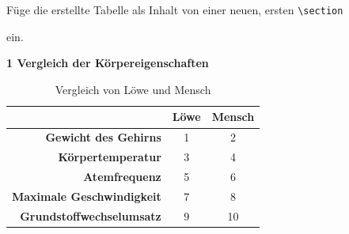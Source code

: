 \documentclass["WS\space 16-17\space -\space LaTeX-Kurs\space -\space Praesentation\space -\space 2.tex"]{subfiles}
\begin{document}
\begin{frame}[fragile]
	\Aufgabee
		Füge die erstellte Tabelle als Inhalt von einer neuen, ersten \lstinline[basicstyle=\normalfont\ttfamily\normalsize]|\section|
        
        \textrm{}
        
        ein.
	\begin{outputbox}
		{\LARGE \textbf{1 Vergleich der Körpereigenschaften}}
		\vspace{-0.3cm}
		\begin{center}
            \begin{table}[htbp] 
                \centering
            	\caption{Vergleich von Löwe und Mensch}
                \vspace{-0.4cm}
            	\begin{tabular}{|r|c|c|}
            		\hline 
            		\textbf{}                         & \textbf{Löwe} & \textbf{Mensch}  \\ \hline 
            		\textbf{Gewicht des Gehirns}      & 1             & 2                \\ \hline 
            		\textbf{Körpertemperatur}         & 3             & 4                \\ \hline 
            		\textbf{Atemfrequenz}             & 5             & 6                \\ \hline 
            		\textbf{Maximale Geschwindigkeit} & 7             & 8                \\ \hline 
            		\textbf{Grundstoffwechselumsatz}  & 9             & 10               \\ \hline
            	\end{tabular} 
            	\label{}
            \end{table}
		\end{center}
	\end{outputbox}

\end{frame}
\end{document}
